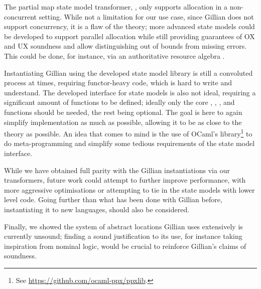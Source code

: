 The partial map state model transformer, \PMap, only supports allocation in a non-concurrent setting. While not a limitation for our use case, since Gillian does not support concurrency, it is a flaw of the theory; more advanced state models could be developed to support parallel allocation while still providing guarantees of OX and UX soundness and allow distinguishing out of bounds from missing errors. This could be done, for instance, via an authoritative resource algebra \cite{iris}.

Instantiating Gillian using the developed state model library is still a convoluted process at times, requiring functor-heavy code, which is hard to write and understand. The developed interface for state models is also not ideal, requiring a significant amount of functions to be defined; ideally only the core \execac, \consume, \produce{}, and \fix{} functions should be needed, the rest being optional. The goal is here to again simplify implementation as much as possible, allowing it to be as close to the theory as possible. An idea that comes to mind is the use of OCaml's  library\footnote{See \url{https://github.com/ocaml-ppx/ppxlib}.} to do meta-programming and simplify some tedious requirements of the state model interface.

While we have obtained full parity with the Gillian instantiations via our transformers, future work could attempt to further improve performance, with more aggressive optimisations or attempting to tie in the state models with lower level code. Going further than what has been done with Gillian before, instantiating it to new languages, should also be considered.

Finally, we showed the system of abstract locations Gillian uses extensively is currently unsound; finding a sound justification to its use, for instance taking inspiration from nominal logic, would be crucial to reinforce Gillian's claims of soundness.
